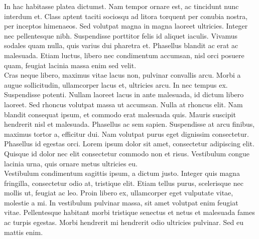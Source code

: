 In hac habitasse platea dictumst. Nam tempor ornare est, ac tincidunt nunc interdum et. Class aptent taciti sociosqu ad litora torquent per conubia nostra, per inceptos himenaeos. Sed volutpat magna in magna laoreet ultricies. Integer nec pellentesque nibh. Suspendisse porttitor felis id aliquet iaculis. Vivamus sodales quam nulla, quis varius dui pharetra et. Phasellus blandit ac erat ac malesuada. Etiam luctus, libero nec condimentum accumsan, nisl orci posuere quam, feugiat lacinia massa enim sed velit.\\
Cras neque libero, maximus vitae lacus non, pulvinar convallis arcu. Morbi a augue sollicitudin, ullamcorper lacus et, ultricies arcu. In nec tempus ex. Suspendisse potenti. Nullam laoreet lacus in ante malesuada, id dictum libero laoreet. Sed rhoncus volutpat massa ut accumsan. Nulla at rhoncus elit. Nam blandit consequat ipsum, et commodo erat malesuada quis. Mauris suscipit hendrerit nisl et malesuada. Phasellus ac sem sapien. Suspendisse at arcu finibus, maximus tortor a, efficitur dui. Nam volutpat purus eget dignissim consectetur. Phasellus id egestas orci. Lorem ipsum dolor sit amet, consectetur adipiscing elit. Quisque id dolor nec elit consectetur commodo non et risus. Vestibulum congue lacinia urna, quis ornare metus ultricies eu.\\
Vestibulum condimentum sagittis ipsum, a dictum justo. Integer quis magna fringilla, consectetur odio at, tristique elit. Etiam tellus purus, scelerisque nec mollis ut, feugiat ac leo. Proin libero ex, ullamcorper eget vulputate vitae, molestie a mi. In vestibulum pulvinar massa, sit amet volutpat enim feugiat vitae. Pellentesque habitant morbi tristique senectus et netus et malesuada fames ac turpis egestas. Morbi hendrerit mi hendrerit odio ultricies pulvinar. Sed eu mattis enim.
\newpage